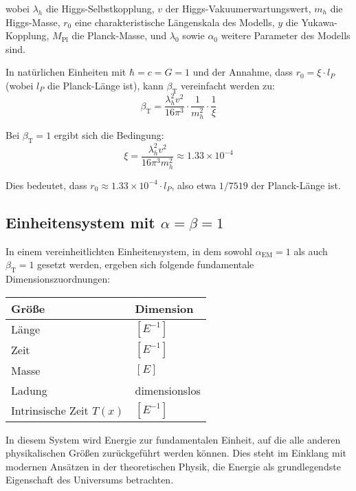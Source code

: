 \documentclass[12pt,a4paper]{article}
\newcommand{\Tfield}{T(x)}
\newcommand{\alphaEM}{\alpha_{\text{EM}}}
\newcommand{\betaT}{\beta_{\text{T}}}
\newcommand{\Mpl}{M_{\text{Pl}}}
\begin{document}
	wobei $\lambda_h$ die Higgs-Selbstkopplung, $v$ der Higgs-Vakuumerwartungswert, $m_h$ die Higgs-Masse, $r_0$ eine charakteristische Längenskala des Modells, $y$ die Yukawa-Kopplung, $\Mpl$ die Planck-Masse, und $\lambda_0$ sowie $\alpha_0$ weitere Parameter des Modells sind.
	
	In natürlichen Einheiten mit $\hbar = c = G = 1$ und der Annahme, dass $r_0 = \xi \cdot l_P$ (wobei $l_P$ die Planck-Länge ist), kann $\betaT$ vereinfacht werden zu:
	\begin{equation}
		\betaT = \frac{\lambda_h^2 v^2}{16\pi^3} \cdot \frac{1}{m_h^2} \cdot \frac{1}{\xi}
	\end{equation}
	
	Bei $\betaT = 1$ ergibt sich die Bedingung:
	\begin{equation}
		\xi = \frac{\lambda_h^2 v^2}{16\pi^3 m_h^2} \approx 1.33 \times 10^{-4}
	\end{equation}
	
	Dies bedeutet, dass $r_0 \approx 1.33 \times 10^{-4} \cdot l_P$, also etwa $1/7519$ der Planck-Länge ist.
	
	\subsection{Einheitensystem mit $\alpha = \beta = 1$}
	
	In einem vereinheitlichten Einheitensystem, in dem sowohl $\alphaEM = 1$ als auch $\betaT = 1$ gesetzt werden, ergeben sich folgende fundamentale Dimensionszuordnungen:
	
	\begin{tcolorbox}[colback=blue!5!white,colframe=blue!75!black,title=Dimensionszuordnungen im vereinheitlichten Einheitensystem]
		\begin{tabular}{ll}
			\textbf{Größe} & \textbf{Dimension} \\
			\hline
			Länge & $[E^{-1}]$ \\
			Zeit & $[E^{-1}]$ \\
			Masse & $[E]$ \\
			Ladung & dimensionslos \\
			Intrinsische Zeit $\Tfield$ & $[E^{-1}]$ \\
		\end{tabular}
	\end{tcolorbox}
	
	In diesem System wird Energie zur fundamentalen Einheit, auf die alle anderen physikalischen Größen zurückgeführt werden können. Dies steht im Einklang mit modernen Ansätzen in der theoretischen Physik, die Energie als grundlegendste Eigenschaft des Universums betrachten.
	
\end{document}
